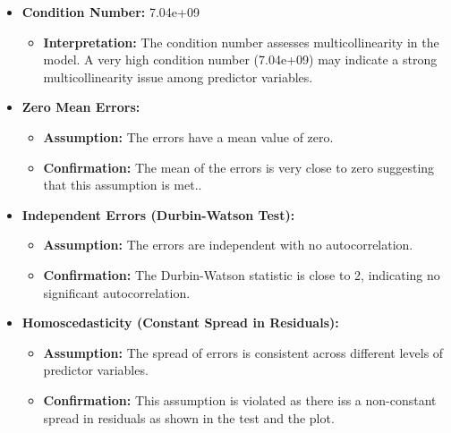 \documentclass[fleqn,a4paper,12pt]{article}
\begin{document}
 
\begin{itemize}
\item \textbf{Condition Number:} 7.04e+09 
  \begin{itemize}
  \item \textbf{Interpretation:} The condition number assesses multicollinearity in the model. A very high condition number (7.04e+09) may indicate a strong multicollinearity issue among predictor variables.
  \end{itemize}
\end{itemize}
 

\begin{itemize}
\item \textbf{Zero Mean Errors:}
   \begin{itemize}
   \item \textbf{Assumption:} The errors have a mean value of zero.
   \item \textbf{Confirmation:} The mean of the errors is very close to zero suggesting that this assumption is met..
   \end{itemize}

\item \textbf{Independent Errors (Durbin-Watson Test):}
   \begin{itemize}
   \item \textbf{Assumption:} The errors are independent with no autocorrelation.
   \item \textbf{Confirmation:} The Durbin-Watson statistic is close to 2, indicating no significant autocorrelation.
   \end{itemize}

\item \textbf{Homoscedasticity (Constant Spread in Residuals):}
   \begin{itemize}
   \item \textbf{Assumption:} The spread of errors is consistent across different levels of predictor variables.
   \item \textbf{Confirmation:} This assumption is violated as there iss a non-constant spread in residuals as shown in the test and the plot.
   \end{itemize}
\end{itemize}
 
\end{document}
